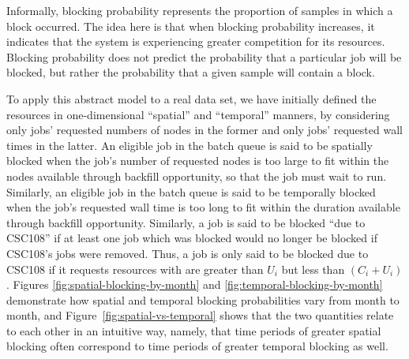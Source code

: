 Informally, blocking probability represents the proportion of samples in which
a block occurred. The idea here is that when blocking probability increases, it
indicates that the system is experiencing greater competition for its
resources. Blocking probability does not predict the probability that a
particular job will be blocked, but rather the probability that a given sample
will contain a block.

To apply this abstract model to a real data set, we have initially defined the
resources in one-dimensional ``spatial'' and ``temporal'' manners, by
considering only jobs' requested numbers of nodes in the former and only jobs'
requested wall times in the latter. An eligible job in the batch queue is said
to be spatially blocked when the job’s number of requested nodes is too large
to fit within the nodes available through backfill opportunity, so that the job
must wait to run. Similarly, an eligible job in the batch queue is said to be
temporally blocked when the job’s requested wall time is too long to fit within
the duration available through backfill opportunity. Similarly, a job is said
to be blocked ``due to CSC108'' if at least one job which was blocked would no
longer be blocked if CSC108's jobs were removed. Thus, a job is only said to be
blocked due to CSC108 if it requests resources with are greater than $U_i$ but
less than $(C_i + U_i)$. Figures
\ref{fig:spatial-blocking-by-month} and \ref{fig:temporal-blocking-by-month}
demonstrate how spatial and temporal blocking probabilities vary from month to
month, and Figure~\ref{fig:spatial-vs-temporal} shows that the two quantities
relate to each other in an intuitive way, namely, that time periods of greater
spatial blocking often correspond to time periods of greater temporal blocking
as well.

